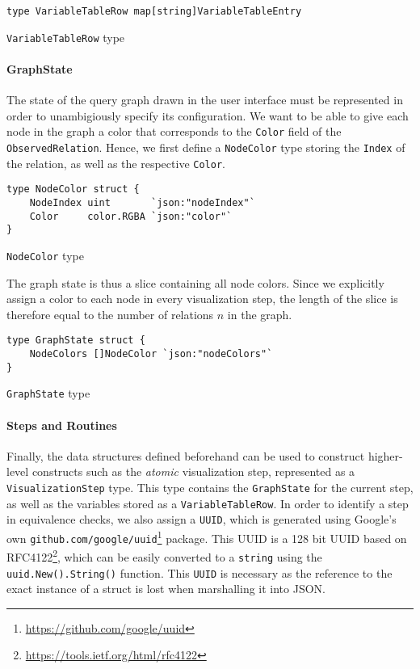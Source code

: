 \begin{code}
\begin{verbatim}
type VariableTableRow map[string]VariableTableEntry
\end{verbatim}
\caption{\texttt{VariableTableRow} type}
\end{code}
\vspace{0.8cm}

\paragraph{GraphState}

The state of the query graph drawn in the user interface must be represented in order to unambigiously specify its configuration. We want to be able to give each node in the graph a color that corresponds to the \texttt{Color} field of the \texttt{ObservedRelation}. Hence, we first define a \texttt{NodeColor} type storing the \texttt{Index} of the relation, as well as the respective \texttt{Color}.

\begin{code}
\begin{verbatim}
type NodeColor struct {
    NodeIndex uint       `json:"nodeIndex"`
    Color     color.RGBA `json:"color"`
}
\end{verbatim}
\caption{\texttt{NodeColor} type}
\end{code}
\vspace{0.8cm}

The graph state is thus a slice containing all node colors. Since we explicitly assign a color to each node in every visualization step, the length of the slice is therefore equal to the number of relations $n$ in the graph.

\begin{code}
\begin{verbatim}
type GraphState struct {
    NodeColors []NodeColor `json:"nodeColors"`
}
\end{verbatim}
\caption{\texttt{GraphState} type}
\end{code}
\vspace{0.8cm}

\paragraph{Steps and Routines}

Finally, the data structures defined beforehand can be used to construct higher-level constructs such as the \textit{atomic} visualization step, represented as a \texttt{VisualizationStep} type. This type contains the \texttt{GraphState} for the current step, as well as the variables stored as a \texttt{VariableTableRow}. In order to identify a step in equivalence checks, we also assign a \texttt{UUID}, which is generated using Google's own \texttt{github.com/google/uuid}\footnote{\url{https://github.com/google/uuid}} package. This UUID is a 128 bit UUID based on RFC4122\footnote{\url{https://tools.ietf.org/html/rfc4122}}, which can be easily converted to a \texttt{string} using the \texttt{uuid.New().String()} function. This \texttt{UUID} is necessary as the reference to the exact instance of a struct is lost when marshalling it into JSON.

